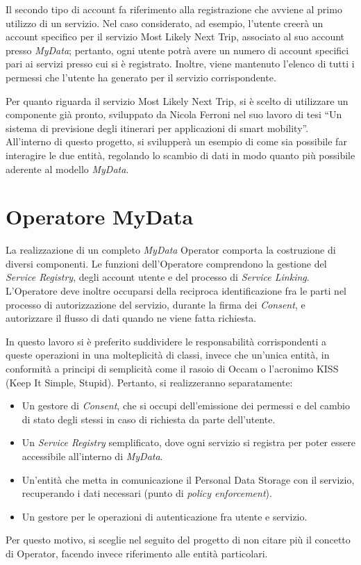 Il secondo tipo di account fa riferimento alla registrazione che avviene al primo utilizzo di un servizio. Nel caso considerato, ad esempio, l’utente creer\`a un account specifico per il servizio Most Likely Next Trip, associato al suo account presso \textit{MyData}; pertanto, ogni utente potr\`a avere un numero di account specifici pari ai servizi presso cui si \`e registrato. Inoltre, viene mantenuto l’elenco di tutti i permessi che l’utente ha generato per il servizio corrispondente.

Per quanto riguarda il servizio Most Likely Next Trip, si \`e scelto di utilizzare un componente gi\`a pronto, sviluppato da Nicola Ferroni nel suo lavoro di tesi “Un sistema di previsione degli itinerari per applicazioni di smart mobility”\cite{MLNT}.  All’interno di questo progetto, si svilupper\`a un esempio di come sia possibile far interagire le due entit\`a, regolando lo scambio di dati in modo quanto pi\`u possibile aderente al modello \textit{MyData}.

\section{Operatore MyData}
\cite{githubmydataoperator}
La realizzazione di un completo \textit{MyData} Operator comporta la costruzione di diversi componenti. Le funzioni dell’Operatore comprendono la gestione del \textit{Service Registry}, degli account utente e del processo di \textit{Service Linking}. L’Operatore deve inoltre occuparsi della reciproca identificazione fra le parti nel processo di autorizzazione del servizio, durante la firma dei \textit{Consent}, e autorizzare il flusso di dati quando ne viene fatta richiesta.

In questo lavoro si \`e preferito suddividere le responsabilit\`a corrispondenti a queste operazioni in una molteplicit\`a di classi, invece che un’unica entit\`a, in conformit\`a a principi di semplicit\`a come il rasoio di Occam o l’acronimo KISS (Keep It Simple, Stupid). Pertanto, si realizzeranno separatamente:
\begin{itemize}
	\item Un gestore di \textit{Consent}, che si occupi dell’emissione dei permessi e del cambio di stato degli stessi in caso di richiesta da parte dell’utente.
	\item Un \textit{Service Registry} semplificato, dove ogni servizio si registra per poter essere accessibile all’interno di \textit{MyData}.
	\item Un’entit\`a che metta in comunicazione il Personal Data Storage con il servizio, recuperando i dati necessari (punto di \textit{policy enforcement}).
	\item Un gestore per le operazioni di autenticazione fra utente e servizio.
\end{itemize}
Per questo motivo, si sceglie nel seguito del progetto di non citare pi\`u il concetto di Operator, facendo invece riferimento alle entit\`a particolari.

